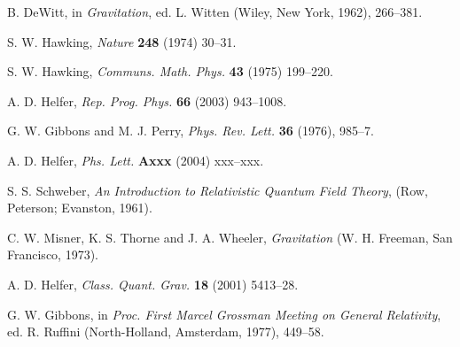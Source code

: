 \documentclass[11pt]{article}
\begin{document}
\begin{thebibliography}{99}

%

B. DeWitt, in {\em Gravitation}, ed. L. Witten
(Wiley, New York, 1962), 266--381.


S. W. Hawking, {\em Nature} {\bf 248} (1974) 30--31. 


S. W. Hawking, {\em Communs. Math. Phys.} {\bf 43} (1975) 199--220.

A. D. Helfer, {\em Rep. Prog. Phys.} {\bf 66} (2003) 943--1008.

G. W. Gibbons and M. J. Perry, {\em Phys. Rev. Lett.} {\bf 36} (1976),
985--7.

A. D. Helfer, {\em Phs. Lett.} {\bf Axxx} (2004) xxx--xxx. 

S. S. Schweber, {\em An Introduction to Relativistic
Quantum Field Theory}, 
(Row, Peterson; Evanston, 1961).

C. W. Misner, K. S. Thorne and J. A. Wheeler, {\em Gravitation}
(W. H. Freeman, San Francisco, 1973).

A. D. Helfer, {\em Class. Quant. Grav.} {\bf 18} (2001) 5413--28.

G. W. Gibbons, in {\em Proc. First
Marcel Grossman Meeting on General Relativity}, ed.
R. Ruffini (North-Holland, Amsterdam, 1977), 
449--58.


\end{thebibliography}
\end{document}
